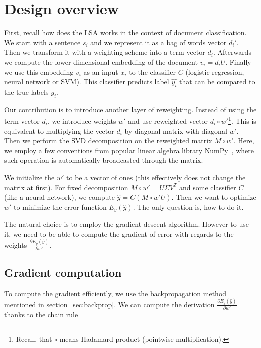 \section{Design overview} \label{sec:design}

    First, recall how does the LSA works in the context of document classification.
    We start with a sentence $s_i$ and we represent it as a bag of words vector $d_i'$. 
    Then we transform it with a weighting scheme into a term vector $d_i$.
    Afterwards we compute the lower dimensional embedding of the document $v_i = d_i U$. 
    Finally we use this embedding $v_i$ as an input $x_i$ to the classifier $C$ (logistic regression, neural network or SVM).
    This classifier predicts label $\hat{y_i}$ that can be compared to
    the true labels $y_i$.
    
    Our contribution is to introduce another layer of reweighting. 
    Instead of using the term vector $d_i$, we introduce weights $w'$ and use reweighted vector $d_i \circ w'$\footnote{Recall, that $\circ$ means Hadamard product (pointwise multiplication).}.
    This is equivalent to multiplying the vector $d_i$ by diagonal matrix with diagonal $w'$.
    Then we perform the SVD decomposition on the reweighted matrix $M \circ w'$. 
    Here, we employ a few conventions from popular linear algebra library NumPy~\cite{oliphant2006guide}, 
    where such operation is automatically broadcasted through the matrix.
    
    We initialize the $w'$ to be a vector of ones (this effectively does not change the matrix at first).
    For fixed decomposition $M\circ w'= U\Sigma V^T$ and some classifier $C$ (like a neural network),
    we compute $\hat{y} = C(M \circ w' U)$.
    Then we want to optimize $w'$ to minimize the error function $E_y(\hat{y})$.
    The only question is, how to do it.
    
    The natural choice is to employ the gradient descent algorithm. 
    However to use it, we need to be able to compute the gradient of error with regards to the weights $\frac{\partial E_y(\hat{y})}{\partial w'}$.
    
    \subsection{Gradient computation}
    
    To compute the gradient efficiently, we use the backpropagation method mentioned in section~\ref{sec:backprop}.
    We can compute the derivation $\frac{\partial E_y(\hat{y})}{\partial w'}$ thanks to the chain rule
    
